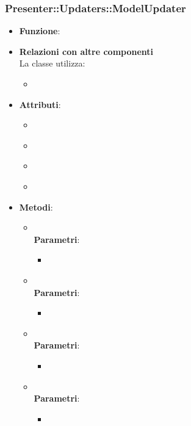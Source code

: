 \subsubsection{Presenter::Updaters::ModelUpdater}
\begin{itemize}
\item\textbf{Funzione}:
\item\textbf{Relazioni con altre componenti}\\
La classe utilizza:
	\begin{itemize}
		\item
	\end{itemize}
\item\textbf{Attributi}:
	\begin{itemize}
		\item\code{}\\
		\item\code{}\\
		\item\code{}\\
		\item\code{}\\
	\end{itemize}
\item\textbf{Metodi}:
	\begin{itemize}
		\item\code{}\\
		\textbf{Parametri}:
			\begin{itemize}
				\item\code{}\\
			\end{itemize}
		\item\code{}\\
		\textbf{Parametri}:
			\begin{itemize}
				\item\code{}\\
			\end{itemize}
		\item\code{}\\
		\textbf{Parametri}:
			\begin{itemize}
				\item\code{}\\
			\end{itemize}
		\item\code{}\\
		\textbf{Parametri}:
			\begin{itemize}
				\item\code{}\\
			\end{itemize}
	\end{itemize}
\end{itemize}

